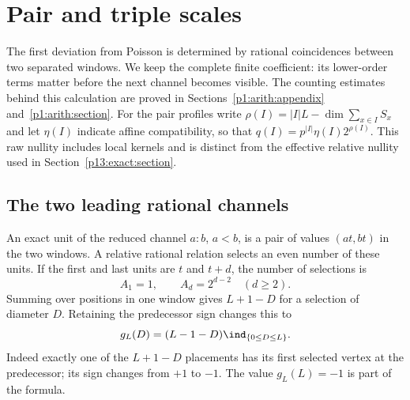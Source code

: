 \section{Pair and triple scales}
\label{p2:scales}

The first deviation from Poisson is determined by rational coincidences
between two separated windows. We keep the complete finite coefficient:
its lower-order terms matter before the next channel becomes visible.
The counting estimates behind this calculation are proved in
Sections~\ref{p1:arith:appendix} and~\ref{p1:arith:section}.
For the pair profiles write $\rho(I)=|I|L-\dim\sum_{x\in I}S_x$
and let $\eta(I)$ indicate affine compatibility, so that
$q(I)=p^{|I|}\eta(I)2^{\rho(I)}$. This raw nullity includes local
kernels and is distinct from the effective relative nullity used in
Section~\ref{p13:exact:section}.

\subsection{The two leading rational channels}

An exact unit of the reduced channel $a:b$, $a<b$, is a pair of values
$(at,bt)$ in the two windows.  A relative rational relation selects an even
number of these units.  If the first and last units are $t$ and $t+d$, the
number of selections is
\[
 A_1=1,\qquad A_d=2^{d-2}\quad(d\geq2).
\]
Summing over positions in one window gives $L+1-D$ for a selection of
diameter $D$.  Retaining the predecessor sign changes this to
\begin{equation}\label{p1:arith:diametersign}
 g_L(D)=(L-1-D)\ind_{\{0\leq D\leq L\}}.
\end{equation}
Indeed exactly one of the $L+1-D$ placements has its first selected vertex
at the predecessor; its sign changes from $+1$ to $-1$.  The value
$g_L(L)=-1$ is part of the formula.


